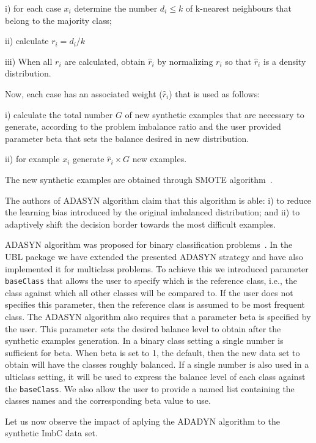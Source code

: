 \documentclass[10pt,a4paper]{article}\usepackage[]{graphicx}\usepackage[]{color}
\begin{document}
i) for each case $x_i$ determine the number $d_i \leq k$ of k-nearest neighbours that belong to the majority class;

ii) calculate $r_i = d_i/k$

iii) When all $r_i$ are calculated, obtain $\hat{r}_i$ by normalizing $r_i$ so that $\hat{r}_i$ is a density distribution.


Now, each case has an associated weight ($\hat{r}_i$) that is used as follows:

i) calculate the total number $G$ of new synthetic examples that are necessary to generate, according to the problem imbalance ratio and the user provided parameter beta that sets the balance desired in new distribution.

ii) for example $x_i$ generate $\hat{r}_i \times G$ new examples.

The new synthetic examples are obtained through SMOTE algorithm~\cite{CBOK02}.


The authors of ADASYN algorithm claim that this algorithm is able: i) to reduce the learning bias introduced by the original imbalanced distribution; and ii) to  adaptively shift the decision border towards the most difficult examples.


ADASYN algorithm was proposed for binary classification problems~\cite{he2008adasyn}. In the UBL package we have extended the presented ADASYN strategy and have also implemented it for multiclass problems. To achieve this we introduced parameter \texttt{baseClass} that allows the user to specify which is the reference class, i.e., the class against which all other classes will be compared to. If the user does not specifies this parameter, then the reference class is assumed to be most frequent class. The ADASYN algorithm also requires that a parameter beta is specified by the user. This parameter sets the desired balance level to obtain after the synthetic examples generation. In a binary class setting a single number is sufficient for beta. When beta is set to 1, the default, then the new data set to obtain will have the classes roughly balanced. If a single number is also used in a ulticlass setting, it will be used to express the balance level of each class against the \texttt{baseClass}. We also allow the user to provide a named list containing the classes names and the corresponding beta value to use.  


Let us now observe the impact of aplying the ADADYN algorithm to the synthetic ImbC data set.
\end{document}
